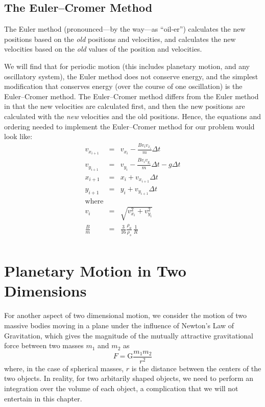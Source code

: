  \subsection{The Euler--Cromer Method}
The Euler method (pronounced---by the way---as ``oil-er'') calculates the new positions based on the \textit{old} positions and velocities, and calculates the new velocities based on the \textit{old} values of the position and velocities. 

We will find that for periodic motion (this includes planetary motion, and any oscillatory system), the Euler method does not conserve energy, and the simplest modification that conserves energy (over the course of one oscillation) is the Euler--Cromer method. The Euler--Cromer method differs from the Euler method in that the new velocities are calculated first, and then the new positions are calculated with the \textit{new} velocities and the old positions. Hence, the equations and ordering needed to implement the Euler--Cromer method for our problem would look like:
\begin{eqnarray}
 v_{x_{i+1}} & = & v_{x_i} - \frac{B v_i v_{x_i}}{m}\Delta t \nonumber \\
 v_{y_{i+1}} & = & v_{y_i} - \frac{B v_i v_{y_i}}{m}\Delta t - g\Delta t \nonumber \\
 x_{i+1} & = & x_i + v_{x_{i+1}} \Delta t     \nonumber \\
 y_{i+1} & = & y_i + v_{y_{i+1}} \Delta t  \nonumber \\[4mm]
 \mathrm{where} & &\nonumber \\[4mm]
 v_i &  = & \sqrt{v^2_{x_i} + v^2_{y_i}} \nonumber \\[4mm]
 \frac{B}{m} & = & \frac{3}{16} \frac{\rho_a}{\rho_s} \, \frac{1}{R} \nonumber \\
 \label{eq:2dEulerCromer}
\end{eqnarray}


\pagebreak 

\section{Planetary Motion in Two Dimensions}
\label{sec-planetaryMotion}

For another aspect of two dimensional motion, we consider the motion of two massive bodies moving in a plane under the influence of Newton's Law of Gravitation, which gives the magnitude of the mutually attractive gravitational force between two masses $m_1$ and $m_2$ as
$$  F = \mathrm{G}\frac{m_1 m_2}{r^2}   $$
where, in the case of spherical masses, $r$ is the distance between the centers of the two objects. In reality, for two arbitarily shaped objects, we need to perform an integration over the volume of each object, a complication that we will not entertain in this chapter.

